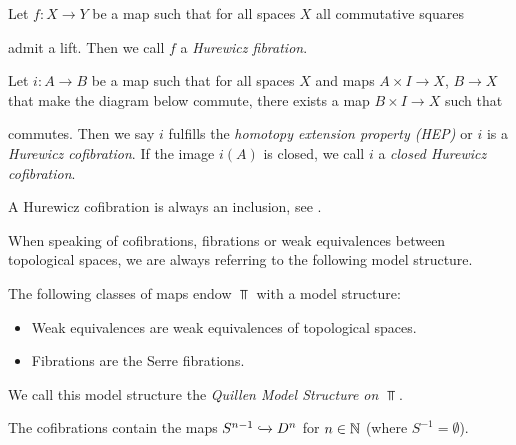 \begin{definition}
    Let $f\colon X\to Y$ be a map such that for all spaces $X$ all commutative squares
    \begin{center}
    \end{center}
    admit a lift.
    Then we call $f$ a \emph{Hurewicz fibration}.
\end{definition}
\begin{definition}
    Let $i\colon A\to B$ be a map such that for all spaces $X$ and maps $A\times I\to X$, $B\to X$ that make the diagram below commute, there exists a map $B\times I\to X$ such that
    \begin{center}
    \end{center}
    commutes.
    Then we say $i$ fulfills the \emph{homotopy extension property (HEP)} or $i$ is a \emph{Hurewicz cofibration}.
    If the image $i(A)$ is closed, we call $i$ a \emph{closed Hurewicz cofibration}.
\end{definition}
\begin{remark}
    A Hurewicz cofibration is always an inclusion, see \cite[Proposition 4H.1]{hatcher2002algebraic}.
\end{remark}
When speaking of cofibrations, fibrations or weak equivalences between topological spaces, we are always referring to the following model structure.
\begin{prop}
    The following classes of maps endow $\Top$ with a model structure:
    \begin{itemize}
        \item Weak equivalences are weak equivalences of topological spaces.
        \item Fibrations are the Serre fibrations.
    \end{itemize}
    We call this model structure the \emph{Quillen Model Structure on $\Top$}.
    
    The cofibrations contain the maps $S^{n-1}\xhookrightarrow{}D^n$ for $n\in\mathbb{N}$ (where $S^{-1}=\emptyset$).
    \begin{reference}
        \cite[Chap. II, \S 3, Theorem 1]{Quillen1967}
    \end{reference}
\end{prop}
